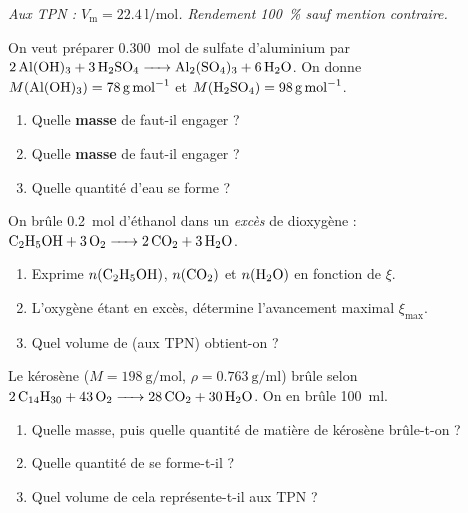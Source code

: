\documentclass[11pt,a4paper]{article}
\begin{document}
\begin{center}\small\itshape
Aux TPN : $V_{\mathrm{m}}=\qty{22.4}{\litre\per\mole}$. Rendement \qty{100}{\percent} sauf mention contraire.
\end{center}

\begin{exo}
On veut préparer \qty{0.300}{\mole} de sulfate d'aluminium par
$\ce{2 Al(OH)3 + 3 H2SO4 -> Al2(SO4)3 + 6 H2O}$. On donne
$M(\ce{Al(OH)3})=\qty{78}{\gram\per\mole}$ et $M(\ce{H2SO4})=\qty{98}{\gram\per\mole}$.
\begin{enumerate}[label=\alph*)]
  \item Quelle \textbf{masse} de  faut-il engager ?
  \item Quelle \textbf{masse} de  faut-il engager ?
  \item Quelle quantité d'eau se forme ?
\end{enumerate}
\end{exo}

\begin{exo}
On brûle \qty{0.2}{\mole} d'éthanol dans un \emph{excès} de dioxygène :
$\ce{C2H5OH + 3 O2 -> 2 CO2 + 3 H2O}$.
\begin{enumerate}[label=\alph*)]
  \item Exprime $n(\ce{C2H5OH})$, $n(\ce{CO2})$ et $n(\ce{H2O})$ en fonction de $\xi$.
  \item L'oxygène étant en excès, détermine l'avancement maximal $\xi_{\max}$.
  \item Quel volume de  (aux TPN) obtient-on ?
\end{enumerate}
\end{exo}

\begin{exo}
Le kérosène  ($M=\qty{198}{\gram\per\mole}$, $\rho=\qty{0.763}{\gram\per\milli\litre}$)
brûle selon $\ce{2 C14H30 + 43 O2 -> 28 CO2 + 30 H2O}$. On en brûle \qty{100}{\milli\litre}.
\begin{enumerate}[label=\alph*)]
  \item Quelle masse, puis quelle quantité de matière de kérosène brûle-t-on ?
  \item Quelle quantité de  se forme-t-il ?
  \item Quel volume de  cela représente-t-il aux TPN ?
\end{enumerate}
\end{exo}
\end{document}
